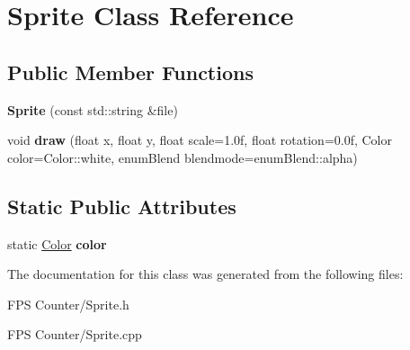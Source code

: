 \hypertarget{class_sprite}{}\section{Sprite Class Reference}
\label{class_sprite}
\subsection*{Public Member Functions}
\begin{DoxyCompactItemize}
\item 
\mbox{\label{class_sprite_a7f8f0cbc76b11c16860fbda7f1e23ef1}} 
{\bfseries Sprite} (const std\+::string \&file)
\item 
\mbox{\label{class_sprite_aa93521985ef2c64b860a5d81dd90c23a}} 
void {\bfseries draw} (float x, float y, float scale=1.\+0f, float rotation=0.\+0f, Color color=\+Color\+::white, enum\+Blend blendmode=enum\+Blend\+::alpha)
\end{DoxyCompactItemize}
\subsection*{Static Public Attributes}
\begin{DoxyCompactItemize}
\item 
\mbox{\label{class_sprite_a4828d83bfc97792c9a3b9c337817adaf}} 
static \mbox{\hyperlink{class_color}{Color}} {\bfseries color}
\end{DoxyCompactItemize}


The documentation for this class was generated from the following files\+:\begin{DoxyCompactItemize}
\item 
F\+P\+S Counter/Sprite.\+h\item 
F\+P\+S Counter/Sprite.\+cpp\end{DoxyCompactItemize}
